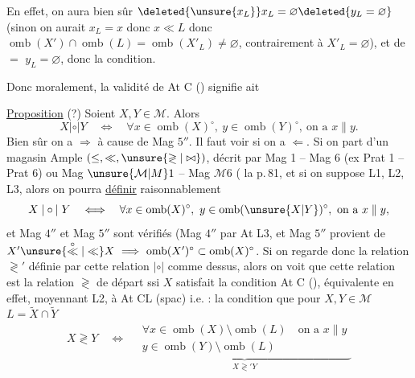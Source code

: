
En effet, on aura bien sûr $\deleted{\unsure{x_L}}x_L=\varnothing\deleted{y_L=\varnothing}$ (sinon on aurait $x_L=x$ donc $x\ll L$  donc $\operatorname{omb}(X')\cap\operatorname{omb}(L)=\operatorname{omb}(X'_L)\ne\varnothing$, contrairement à $X'_L=\varnothing$), et de $=$ $y_L=\varnothing$, donc la condition.

Donc moralement, la validité de At C () signifie       ait

\uline{Proposition} (?) Soient $X,Y\in\mathcal M$.  Alors
\[
X\mathrel{|\circ|}Y\quad\Longleftrightarrow\quad\forall x\in\operatorname{omb}(X)^{\circ},\ y\in\operatorname{omb}(Y)^{\circ},\ \text{on a }x\parallel y.
\]
Bien sûr on a $\Longrightarrow$ à cause de Mag $5''$. Il faut voir si on a $\Longleftarrow$. Si on part d'un magasin Ample $(\leq,\ll,\unsure{\gtrless|\bowtie})$, décrit par Mag 1 -- Mag 6 (ex Prat 1 -- Prat 6) ou Mag $\unsure{\mathcal M|M}1$ -- Mag $\mathcal M6$ ( la p.\,81, et si on suppose  L1, L2, L3, alors on pourra \uline{définir} raisonnablement
\[
X\mathrel{|\circ|}Y\quad\Longleftrightarrow\quad\forall x\in\operatorname{omb}(X)^{\circ},\ y\in\operatorname{omb}(\unsure{X|Y})^{\circ},\ \text{on a }x\parallel y,
\]
et Mag $4''$ et Mag $5''$ sont vérifiés (Mag $4''$  par At L3, et Mag $5''$ provient de $X'\unsure{\overset{\circ}{\ll}|\ll}X\ \Longrightarrow\ \operatorname{omb}(X')^{\circ}\subset\operatorname{omb}(X)^{\circ}$. Si on regarde donc la relation $\gtrless'$ définie par cette relation $\mathrel{|\circ|}$ comme dessus, alors on voit que cette relation est la relation $\gtrless$ de départ ssi $X$ satisfait la condition At C (), équivalente en effet, moyennant L2, à At CL (spac) i.e. : la condition que pour $X,Y\in\mathcal M$ $L=\widetilde X\cap\widetilde Y$
\[
X\gtrless Y\quad\Longleftrightarrow\quad
\underbrace{\begin{gathered}
\forall x\in\operatorname{omb}(X)\setminus\operatorname{omb}(L)\quad\text{on a }x\parallel y\\
y\in\operatorname{omb}(Y)\setminus\operatorname{omb}(L)
\end{gathered}}_{X\gtrless'Y}
\]

